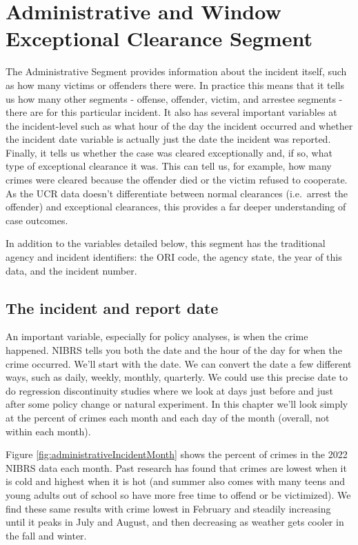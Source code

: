 \documentclass[
]{krantz}
\begin{document}
\chapter{Administrative and Window Exceptional Clearance
Segment}\label{administrative-and-window-exceptional-clearance-segment}

The Administrative Segment provides information about the
incident itself, such as how many victims or offenders there
were. In practice this means that it tells us how many other
segments - offense, offender, victim, and arrestee segments
- there are for this particular incident. It also has
several important variables at the incident-level such as
what hour of the day the incident occurred and whether the
incident date variable is actually just the date the
incident was reported. Finally, it tells us whether the case
was cleared exceptionally and, if so, what type of
exceptional clearance it was. This can tell us, for example,
how many crimes were cleared because the offender died or
the victim refused to cooperate. As the UCR data doesn't
differentiate between normal clearances (i.e.~arrest the
offender) and exceptional clearances, this provides a far
deeper understanding of case outcomes.

In addition to the variables detailed below, this segment
has the traditional agency and incident identifiers: the ORI
code, the agency state, the year of this data, and the
incident number.

\section{The incident and report
date}\label{the-incident-and-report-date}

An important variable, especially for policy analyses, is
when the crime happened. NIBRS tells you both the date and
the hour of the day for when the crime occurred. We'll start
with the date. We can convert the date a few different ways,
such as daily, weekly, monthly, quarterly. We could use this
precise date to do regression discontinuity studies where we
look at days just before and just after some policy change
or natural experiment. In this chapter we'll look simply at
the percent of crimes each month and each day of the month
(overall, not within each month).

Figure \ref{fig:administrativeIncidentMonth} shows the
percent of crimes in the 2022 NIBRS data each month. Past
research has found that crimes are lowest when it is cold
and highest when it is hot (and summer also comes with many
teens and young adults out of school so have more free time
to offend or be victimized). We find these same results with
crime lowest in February and steadily increasing until it
peaks in July and August, and then decreasing as weather
gets cooler in the fall and winter.
\end{document}
